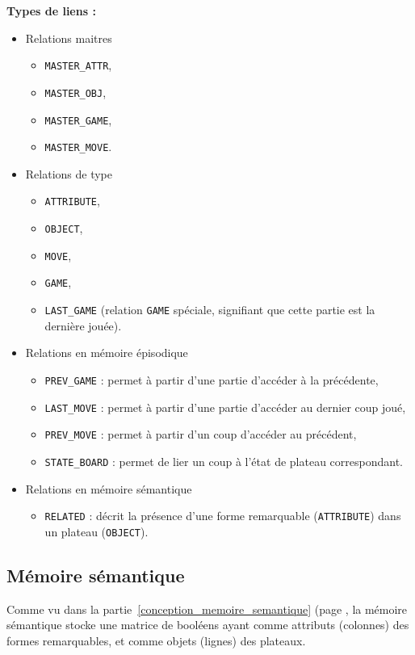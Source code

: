 \textbf{Types de liens :}
\begin{itemize}
	\item Relations maitres
		\begin{itemize}
			\item \texttt{MASTER\_ATTR},
			\item \texttt{MASTER\_OBJ},
			\item \texttt{MASTER\_GAME},
			\item \texttt{MASTER\_MOVE}.
		\end{itemize}
	\item Relations de type
		\begin{itemize}
			\item \texttt{ATTRIBUTE},
			\item \texttt{OBJECT},
			\item \texttt{MOVE},
			\item \texttt{GAME},
			\item \texttt{LAST\_GAME} (relation \texttt{GAME} spéciale, signifiant que cette partie est la dernière jouée).
		\end{itemize}
	\item Relations en mémoire épisodique
		\begin{itemize}
			\item \texttt{PREV\_GAME} : permet à partir d'une partie d'accéder à la précédente,
			\item \texttt{LAST\_MOVE} : permet à partir d'une partie d'accéder au dernier coup joué,
			\item \texttt{PREV\_MOVE} : permet à partir d'un coup d'accéder au précédent,
			\item \texttt{STATE\_BOARD} : permet de lier un coup à l'état de plateau correspondant.
		\end{itemize}
	\item Relations en mémoire sémantique
		\begin{itemize}
			\item \texttt{RELATED} : décrit la présence d'une forme remarquable (\texttt{ATTRIBUTE}) dans un plateau (\texttt{OBJECT}).
		\end{itemize}
	\end{itemize}
	
\subsection{Mémoire sémantique}
Comme vu dans la partie~\ref{conception_memoire_semantique} (page \pageref{conception_memoire_semantique}, la mémoire sémantique stocke une matrice de booléens ayant comme attributs (colonnes) des formes remarquables, et comme objets (lignes) des plateaux.

